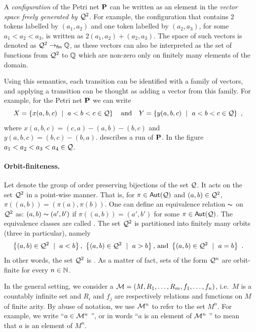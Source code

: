 \documentclass[a4paper,11pt]{article}
\begin{document}
A \emph{configuration} of the Petri net $\mathbf{P}$ can be written as an element in the \emph{vector space freely generated by $\mathcal{Q}^2$}.
For example,
the configuration that contains $2$ tokens labelled by $(a_1,a_2)$ and one token labelled by $(a_2,a_3)$, for some $a_1 < a_2 < a_3$,
is written as $2(a_1,a_2) + (a_2,a_3)$\label{page:formal sum}.
The space of such vectors is denoted as \emph{$\mathcal{Q}^2 \to_{\mathsf{fin}} \mathbb{Q}$},
as these vectors can also be interpreted as the set of functions from $\mathcal{Q}^2$ to $\mathbb{Q}$ which are non-zero only on finitely many elements of the domain.

Using this semantics,
each transition can be identified with a family of vectors,
and applying a transition can be thought as adding a vector from this family.
For example, for the Petri net $\mathbf{P}$ we can write
\begin{equation}\label{eq:tran vec}
X = \left\{x(a,b,c)\ \mid\ a < b < c\in\mathcal{Q} \right\} \quad\text{and}\quad Y = \left\{y(a,b,c)\ \mid\ a < b < c\in\mathcal{Q} \right\}\ ,
\end{equation}
where $x(a,b,c) = (c,a) - (a,b) - (b,c)$ and $y(a,b,c) = (b,c) -  (b,a)$.
 describes a run of $\mathbf{P}$. 
In the figure $a_1 < a_2 < a_3 < a_4 \in\mathcal{Q}$.

\paragraph*{Orbit-finiteness.}
Let \emphdef{$\aut{\dloQ}$} denote the group of order preserving bijections of the set $\mathcal{Q}$.
It acts on the set $\mathcal{Q}^2$ in a point-wise manner.
That is,
for $\pi\in\mathsf{Aut}{\left(\mathcal{Q}\right)}$ and $(a,b)\in\mathcal{Q}^2$,
$\pi((a,b)) = (\pi(a),\pi(b))$.
One can define an equivalence relation $\thicksim$ on $\mathcal{Q}^2$ as:
$(a,b) \thicksim (a',b')$ if $\pi((a,b)) = (a',b')$ for some $\pi\in\mathsf{Aut}{\left(\mathcal{Q}\right)}$.
The equivalence classes are called .
The set $\mathcal{Q}^2$ is partitioned into finitely many orbits (three in particular), namely
\[
\left\{(a,b)\in\mathcal{Q}^2\ \mid\ a < b \right\}
\text{, }\left\{(a,b)\in\mathcal{Q}^2\ \mid\ a > b \right\}
\text{, and }
\left\{(a,b)\in\mathcal{Q}^2\ \mid\ a = b \right\}\ .
\]
%
In other words,
the set $\mathcal{Q}^2$ is .
As a matter of fact, sets of the form $\mathcal{Q}^n$ are orbit-finite for every $n\in\mathbb{N}$.



In the general setting,
we consider a 
\label{page:str}
$\mathcal{M} = (M,R_1,\dots,R_m,f_1,\dots,f_n)$,
i.e.\ $M$ is a countably infinite set and $R_i$ and $f_j$ are respectively relations and functions on $M$ of finite arity.
By abuse of notation,
we use $\mathcal{M}^n$ to refer to the set $M^n$.
For example,
we write ``$a\in\mathcal{M}^n$ '', or in words ``$a$ is an element of $\mathcal{M}^n$ '' to mean that $a$ is an element of $M^n$.
\end{document}
